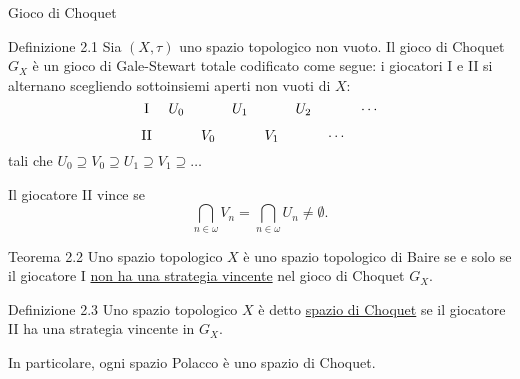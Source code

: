 \documentclass[babel]{beamer}
\renewcommand{\href}[2]{#2}
\begin{document}
\begin{frame}[label={sec:org6ff8b90}]{Gioco di Choquet}
\begin{block}{Definizione 2.1}
Sia \((X,\tau)\) uno \href{../../../../../../../org/roam/20250103145124-topologia.org}{spazio topologico} non vuoto. Il gioco di Choquet \(G_{X}\) è un \href{../../../../../../../org/roam/20250513155732-logic_game.org}{gioco} \href{../../../../../../../org/roam/20250513171520-giochi_di_gale_stewart.org}{di Gale-Stewart} totale codificato come segue: i giocatori I e II si alternano scegliendo sottoinsiemi aperti non vuoti di \(X\):
\begin{equation*}
\begin{tikzcd}[ampersand replacement=\&,cramped,sep=tiny]
	{\text{I}} \& {U_0} \&\& {U_1} \&\& {U_2} \&\& \cdots \\
	{\text{II}} \&\& {V_0} \&\& {V_1} \&\& \cdots
\end{tikzcd}
\end{equation*}
tali che \(U_{0} \supseteq V_{0}\supseteq U_{1}\supseteq V_{1}\supseteq \dots\)

Il giocatore II vince se
\begin{equation*}
\bigcap_{n \in \omega} V_{n} = \bigcap_{n \in \omega} U_{n} \neq \emptyset.
\end{equation*}
\end{block}
\end{frame}
\begin{frame}[label={sec:org8663b73}]
\begin{alertblock}{Teorema 2.2}
Uno \href{../../../../../../../org/roam/20250103145124-topologia.org}{spazio topologico} \(X\) è uno \href{../../../../../../../org/roam/20250514154101-spazio_topologico_di_baire.org}{spazio topologico di Baire} se e solo se il giocatore I \uline{non ha una \href{../../../../../../../org/roam/20250513171520-giochi_di_gale_stewart.org}{strategia} \href{../../../../../../../org/roam/20250513171520-giochi_di_gale_stewart.org}{vincente}} nel \href{../../../../../../../org/roam/20250514174255-gioco_di_choquet.org}{gioco di Choquet} \(G_{X}\).
\end{alertblock}
\begin{block}{Definizione 2.3}
Uno spazio topologico \(X\) è detto \uline{spazio di Choquet} se il giocatore II ha una strategia vincente in \(G_{X}\).
\end{block}

In particolare, ogni spazio Polacco è uno spazio di Choquet.
\end{frame}
\end{document}
